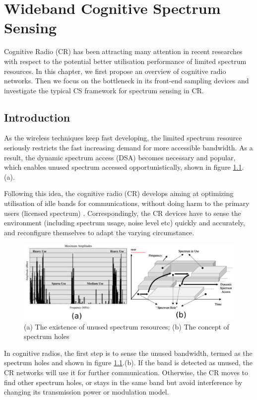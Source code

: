 \chapter{Wideband Cognitive Spectrum Sensing}\label{C:wideband_css}

\indent \indent Cognitive Radio (CR) has been attracting many attention in recent researches with respect to the potential better utilisation performance of limited spectrum resources. In this chapter, we first propose an overview of cognitive radio networks. Then we focus on the bottleneck in its front-end sampling devices and investigate the typical CS framework for spectrum sensing in CR. 

\section{Introduction}

\indent \indent As the wireless techniques keep fast developing, the limited spectrum resource seriously restricts the fast increasing demand for more accessible bandwidth. As a result, the dynamic spectrum access (DSA) becomes necessary and popular, which enables unused spectrum accessed opportunistically, shown in figure \ref{dsa-cr-intro}.(a). 

Following this idea, the cognitive radio (CR) develops aiming at optimizing utilisation of idle bands for communications, without doing harm to the primary users (licensed spectrum) \cite{akyildiz2006next}. Correspondingly, the CR devices have to sense the environment (including spectrum usage, noise level etc) quickly and accurately, and reconfigure themselves to adapt the varying circumstance.

\begin{figure}
\centering
\includegraphics[width=0.85\columnwidth]{figs/cr-intro.pdf}
\caption{(a) The existence of unused spectrum resources; (b) The concept of spectrum holes}
\label{dsa-cr-intro}
\end{figure}

In cognitive radios, the first step is to sense the unused bandwidth, termed as the spectrum holes and shown in figure \ref{dsa-cr-intro}.(b). If the band is detected as unused, the CR networks will use it for further communication. Otherwise, the CR moves to find other spectrum holes, or stays in the same band but avoid interference by changing its transmission power or modulation model.

